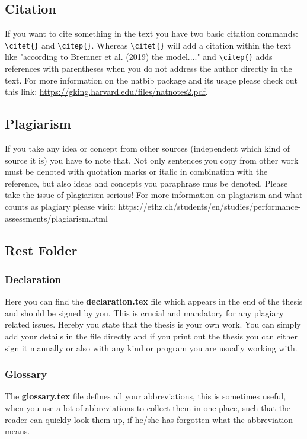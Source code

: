 \subsection{Citation}
If you want to cite something in the text you have two basic citation commands: \verb!\citet{}! and \verb!\citep{}!. Whereas \verb!\citet{}! will add a citation within the text like "according to Bremner et al. (2019) the model...." and \verb!\citep{}! adds references with parentheses when you do not address the author directly in the text. For more information on the natbib package and its usage please check out this link: \url{https://gking.harvard.edu/files/natnotes2.pdf}.

\subsection{Plagiarism}
If you take any idea or concept from other sources (independent which kind of source it is) you have to note that. Not only sentences you copy from other work must be denoted with quotation marks or italic in combination with the reference, but also ideas and concepts you paraphrase mus be denoted. Please take the issue of plagiarism serious! For more information on plagiarism and what counts as plagiary please visit: https://ethz.ch/students/en/studies/performance-assessments/plagiarism.html 

\subsection{Rest Folder}

\subsubsection{Declaration}
Here you can find the \textbf{declaration.tex} file which appears in the end of the thesis and should be signed by you. This is crucial and mandatory for any plagiary related issues. Hereby you state that the thesis is your own work. You can simply add your details in the file directly and if you print out the thesis you can either sign it manually or also with any kind or program you are usually working with.

\subsubsection{Glossary}
The \textbf{glossary.tex} file defines all your abbreviations, this is sometimes useful, when you use a lot of abbreviations to collect them in one place, such that the reader can quickly look them up, if he/she has forgotten what the abbreviation means.

